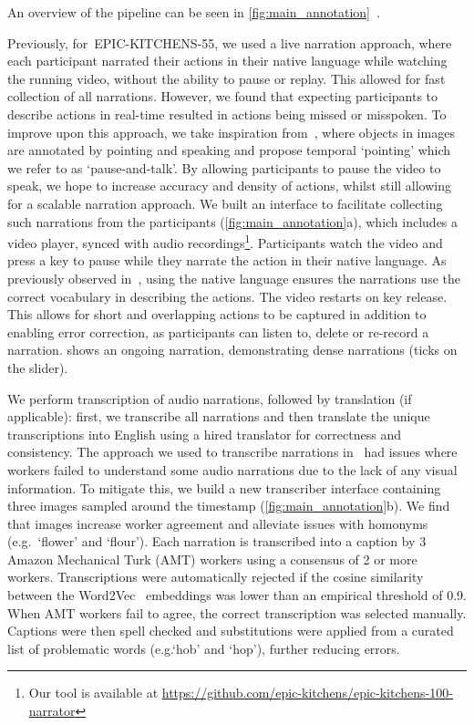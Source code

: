 \RequirePackage{amsmath} \documentclass[runningheads]{llncs}
\makeatletter
\newcommand{\chParagraph}[1]{\noindent {\textbf{#1.}} \hspace{6pt}}
\newcommand {\oldDataset} {EPIC-KITCHENS-55{}}
\newcommand{\annStyle} {`pause-and-talk'{}}
\newcommand*{\eg}{e.g.\@\xspace}
\makeatother
\begin{document}
\chParagraph{Annotation Pipeline} An overview of the pipeline can be seen in \cref{fig:main_annotation}~.


\chParagraph{(a) Narrator}
Previously, for~\oldDataset, we used a live narration approach, where each participant narrated their actions in their native language while watching the running video, without the ability to pause or replay. This allowed for fast collection of all narrations.  However, we found that expecting participants to describe actions in real-time resulted in actions being missed or misspoken.
To improve upon this approach, we take inspiration from~\cite{Gigli2019}, where
objects in images are annotated by pointing and speaking and propose temporal `pointing' which we refer to as \annStyle.
By allowing participants to pause the video to speak, we hope to increase accuracy and density of actions, whilst still allowing for a scalable narration approach.
We built an interface to facilitate collecting such narrations from the participants (\cref{fig:main_annotation}a), which includes a video player, synced with audio recordings\footnote{Our tool is available at \textcolor{blue}{\underline{\url{https://github.com/epic-kitchens/epic-kitchens-100-narrator}}}}. Participants watch the video and press a key to pause while they narrate the action in their native language.
As previously observed in~\cite{Damen2018EPICKITCHENS}, using the native language ensures the narrations use the correct vocabulary in describing the actions.
The video restarts on key release.
This allows for short and overlapping actions to be captured in addition to enabling error correction, as participants can listen to, delete or re-record a narration.
 shows an ongoing narration, demonstrating dense narrations (ticks on the slider). 

\chParagraph{(b) Transcriber}
We perform transcription of audio narrations, followed by translation (if applicable): first, we transcribe all narrations and then translate the unique transcriptions into English using a hired translator for correctness and consistency.
The approach we used to transcribe narrations in~\cite{Damen2018EPICKITCHENS} had issues where workers failed to understand some audio narrations due to the lack of any visual information.
To mitigate this, we build a new transcriber interface containing three images sampled around the timestamp (\cref{fig:main_annotation}b).
We find that images increase worker agreement and alleviate issues with homonyms (\eg~`flower' and `flour').
Each narration is transcribed into a caption by 3 Amazon Mechanical Turk (AMT) workers using a consensus of 2 or more workers.
Transcriptions were automatically rejected if the cosine similarity between the Word2Vec~\cite{mikolov2013efficient} embeddings was lower than an empirical threshold of 0.9.
When AMT workers fail to agree, the correct transcription was selected manually.
Captions were then spell checked and substitutions were applied from a curated list of problematic words (\eg `hob' and `hop'), further reducing errors.
\end{document}
